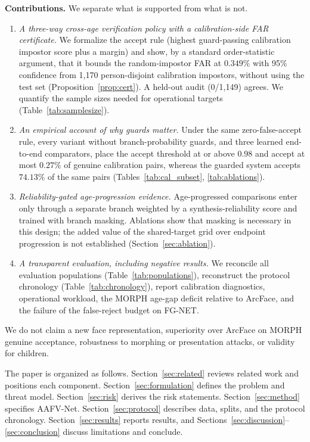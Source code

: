 \documentclass[journal]{IEEEtran}
\newcommand{\sys}{AAFV-Net}
\begin{document}
\textbf{Contributions.} We separate what is supported from what is not.
\begin{enumerate}
\item \emph{A three-way cross-age verification policy with a calibration-side FAR certificate.} We formalize the accept rule (highest guard-passing calibration impostor score plus a margin) and show, by a standard order-statistic argument, that it bounds the random-impostor FAR at $0.349\%$ with 95\% confidence from 1,170 person-disjoint calibration impostors, without using the test set (Proposition~\ref{prop:cert}). A held-out audit (0/1,149) agrees. We quantify the sample sizes needed for operational targets (Table~\ref{tab:samplesize}).
\item \emph{An empirical account of why guards matter.} Under the same zero-false-accept rule, every variant without branch-probability guards, and three learned end-to-end comparators, place the accept threshold at or above $0.98$ and accept at most $0.27\%$ of genuine calibration pairs, whereas the guarded system accepts $74.13\%$ of the same pairs (Tables~\ref{tab:cal_subset}, \ref{tab:ablations}).
\item \emph{Reliability-gated age-progression evidence.} Age-progressed comparisons enter only through a separate branch weighted by a synthesis-reliability score and trained with branch masking. Ablations show that masking is necessary in this design; the added value of the shared-target grid over endpoint progression is not established (Section~\ref{sec:ablation}).
\item \emph{A transparent evaluation, including negative results.} We reconcile all evaluation populations (Table~\ref{tab:populations}), reconstruct the protocol chronology (Table~\ref{tab:chronology}), report calibration diagnostics, operational workload, the MORPH age-gap deficit relative to ArcFace, and the failure of the false-reject budget on FG-NET.
\end{enumerate}
We do not claim a new face representation, superiority over ArcFace on MORPH genuine acceptance, robustness to morphing or presentation attacks, or validity for children.

The paper is organized as follows. Section~\ref{sec:related} reviews related work and positions each component. Section~\ref{sec:formulation} defines the problem and threat model. Section~\ref{sec:risk} derives the risk statements. Section~\ref{sec:method} specifies \sys. Section~\ref{sec:protocol} describes data, splits, and the protocol chronology. Section~\ref{sec:results} reports results, and Sections~\ref{sec:discussion}--\ref{sec:conclusion} discuss limitations and conclude.
\end{document}
